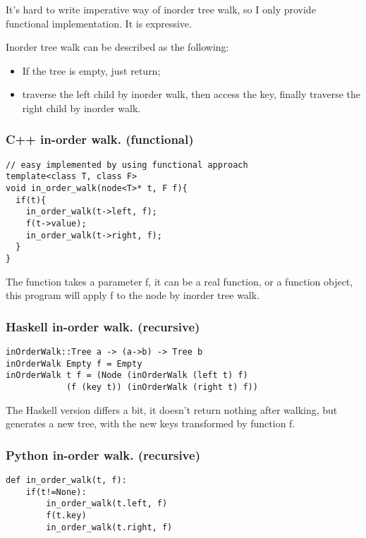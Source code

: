 \documentclass{article}
\begin{document}
It's hard to write imperative way of inorder tree walk, so I only provide
functional implementation. It is expressive.

Inorder tree walk can be described as the following:
\begin{itemize}
\item If the tree is empty, just return;
\item traverse the left child by inorder walk, then access the key, 
finally traverse the right child by inorder walk.
\end{itemize}

\subsubsection*{C++ in-order walk. (functional)}
\lstset{language=C++}
\begin{lstlisting}
// easy implemented by using functional approach
template<class T, class F>
void in_order_walk(node<T>* t, F f){
  if(t){
    in_order_walk(t->left, f);
    f(t->value);
    in_order_walk(t->right, f);
  }
}
\end{lstlisting}

The function takes a parameter f, it can be a real function, or a function
object, this program will apply f to the node by inorder tree walk.

\subsubsection*{Haskell in-order walk. (recursive)}
\lstset{language=Haskell}
\begin{lstlisting}
inOrderWalk::Tree a -> (a->b) -> Tree b
inOrderWalk Empty f = Empty
inOrderWalk t f = (Node (inOrderWalk (left t) f) 
            (f (key t)) (inOrderWalk (right t) f))
\end{lstlisting}

The Haskell version differs a bit, it doesn't return nothing after walking, 
but generates a new tree, with the new keys transformed by function f.

\subsubsection*{Python in-order walk. (recursive)}
\lstset{language=Python}
\begin{lstlisting}
def in_order_walk(t, f):
    if(t!=None):
        in_order_walk(t.left, f)
        f(t.key)
        in_order_walk(t.right, f)
\end{lstlisting}
\end{document}
